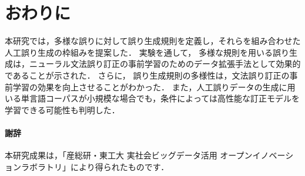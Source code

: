 \documentclass[
  platex, dvipdfmx %
]{nlp2021}
\begin{document}
\section{おわりに}
本研究では，多様な誤りに対して誤り生成規則を定義し，それらを組み合わせた人工誤り生成の枠組みを提案した．
実験を通して，
多様な規則を用いる誤り生成は，ニューラル文法誤り訂正の事前学習のためのデータ拡張手法として効果的であることが示された．
さらに，
誤り生成規則の多様性は，文法誤り訂正の事前学習の効果を向上させることがわかった．
また，人工誤りデータの生成に用いる単言語コーパスが小規模な場合でも，条件によっては高性能な訂正モデルを学習できる可能性も判明した．

\paragraph{謝辞}
本研究成果は，「産総研・東工大 実社会ビッグデータ活用 オープンイノベーションラボラトリ」により得られたものです．







\clearpage
\appendix
\end{document}
